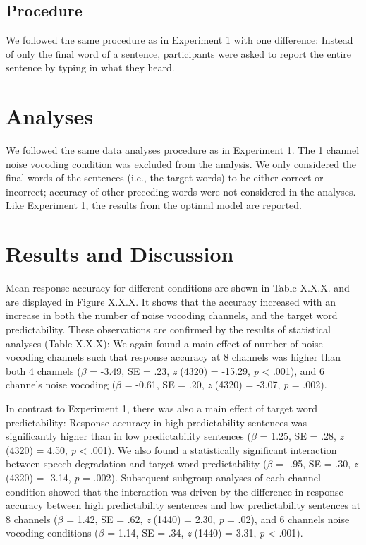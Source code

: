 \documentclass[a4paper, nobind]{templates/ociamthesis}
\begin{document}
\hypertarget{procedure-1}{%
\subsection{Procedure}\label{procedure-1}}

We followed the same procedure as in Experiment 1 with one difference:
Instead of only the final word of a sentence, participants were asked to report the entire sentence by typing in what they heard.

\hypertarget{analyses-1}{%
\section{Analyses}\label{analyses-1}}

We followed the same data analyses procedure as in Experiment 1.
The 1 channel noise vocoding condition was excluded from the analysis.
We only considered the final words of the sentences (i.e., the target words) to be either correct or incorrect; accuracy of other preceding words were not considered in the analyses.
Like Experiment 1, the results from the optimal model are reported.

\hypertarget{results-and-discussion-1}{%
\section{Results and Discussion}\label{results-and-discussion-1}}

Mean response accuracy for different conditions are shown in Table X.X.X. and are displayed in Figure X.X.X.
It shows that the accuracy increased with an increase in both the number of noise vocoding channels, and the target word predictability.
These observations are confirmed by the results of statistical analyses (Table X.X.X):
We again found a main effect of number of noise vocoding channels such that response accuracy at 8 channels was higher than both 4 channels (\(\beta\) = -3.49, SE = .23, \emph{z} (4320) = -15.29, \emph{p} \textless{} .001), and 6 channels noise vocoding (\(\beta\) = -0.61, SE = .20, \emph{z} (4320) = -3.07, \emph{p} = .002).

In contrast to Experiment 1, there was also a main effect of target word predictability:
Response accuracy in high predictability sentences was significantly higher than in low predictability sentences (\(\beta\) = 1.25, SE = .28, \emph{z} (4320) = 4.50, \emph{p} \textless{} .001).
We also found a statistically significant interaction between speech degradation and target word predictability (\(\beta\) = -.95, SE = .30, \emph{z} (4320) = -3.14, \emph{p} = .002).
Subsequent subgroup analyses of each channel condition showed that the interaction was driven by the difference in response accuracy between high predictability sentences and low predictability sentences at 8 channels (\(\beta\) = 1.42, SE = .62, \emph{z} (1440) = 2.30, \emph{p} = .02), and 6 channels noise vocoding conditions (\(\beta\) = 1.14, SE = .34, \emph{z} (1440) = 3.31, \emph{p} \textless{} .001).
\end{document}
